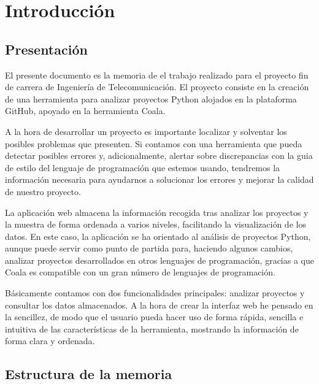 \documentclass[a4paper, 12pt]{book}
\begin{document}

\cleardoublepage
\chapter{Introducción}
\label{sec:intro} %

\section{Presentación}
\label{sec:presentacion}
El presente documento es la memoria de el trabajo realizado para el proyecto fin de carrera de Ingeniería de Telecomunicación. El proyecto consiste en la creación de una herramienta para analizar proyectos Python alojados en la plataforma GitHub, apoyado en la herramienta Coala.

A la hora de desarrollar un proyecto es importante localizar y solventar los posibles problemas que presenten. Si contamos con una herramienta que pueda detectar posibles errores y, adicionalmente, alertar sobre discrepancias con la guia de estilo del lenguaje de programación que estemos usando, tendremos la información necesaria para ayudarnos a solucionar los errores y mejorar la calidad de nuestro proyecto.

La aplicación web almacena la información recogida tras analizar los proyectos y la muestra de forma ordenada a varios niveles, facilitando la visualización de los datos. En este caso, la aplicación se ha orientado al análisis de proyectos Python, aunque puede servir como punto de partida para, haciendo algunos cambios, analizar proyectos desarrollados en otros lenguajes de programación, gracias a que Coala es compatible con un gran número de lenguajes de programación.

Básicamente contamos con dos funcionalidades principales: analizar proyectos y consultar los datos almacenados. A la hora de crear la interfaz web he pensado en la sencillez, de modo que el usuario pueda hacer uso de forma rápida, sencilla e intuitiva de las características de la herramienta, mostrando la información de forma clara y ordenada.

\section{Estructura de la memoria}
\label{sec:estructura}
\end{document}
